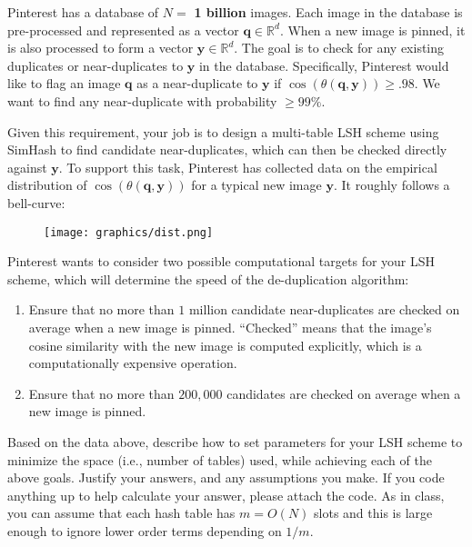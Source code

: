 \documentclass{article}
\begin{document}
Pinterest has a database of $N = $ \textbf{1 billion} images. Each image in the database is pre-processed and represented as a vector $\mathbf{q}\in \mathbb{R}^d$. When a new image is pinned, it is also processed to form a vector $\mathbf{y} \in \mathbb{R}^d$. The goal is to check for any existing duplicates or near-duplicates to $\mathbf{y}$ in the database.  
Specifically, Pinterest would like to flag an image $\mathbf{q}$ as a near-duplicate to $\mathbf{y}$ if $\cos(\theta(\mathbf{q},\mathbf{y})) \geq .98$. We want to find any near-duplicate with probability $\geq 99\%$. 

Given this requirement, your job is to design a multi-table LSH scheme using SimHash to find candidate near-duplicates, which can then be checked directly against $\mathbf{y}$. To support this task, Pinterest has collected data on the empirical distribution of $\cos(\theta(\mathbf{q},\mathbf{y}))$ for a typical new image $\mathbf{y}$. It roughly follows a bell-curve:

\begin{figure}[h]
	\centering
	\texttt{[image: graphics/dist.png]}
\end{figure} 

Pinterest wants to consider two possible computational targets for your LSH scheme, which will determine the speed of the de-duplication algorithm:
\begin{enumerate}
	\item Ensure that no more than $1$ million candidate near-duplicates are checked on average when a new image is pinned. ``Checked'' means that the image's cosine similarity with the new image is computed explicitly, which is a computationally expensive operation.
	\item Ensure that no more than $200,000$ candidates are checked on average when a new image is pinned.
\end{enumerate}

\noindent Based on the data above, describe how to set parameters for your LSH scheme to minimize the space (i.e., number of tables) used, while achieving each of the above goals. Justify your answers, and any assumptions you make.
If you code anything up to help calculate your answer, please attach the code. As in class, you can assume that each hash table has $m = O(N)$ slots and this is large enough to ignore lower order terms depending on $1/m$. 
\end{document}
